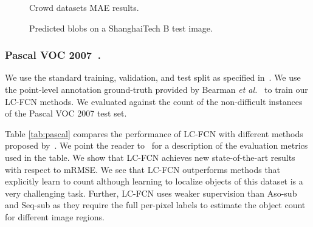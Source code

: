 \documentclass[runningheads]{llncs}
\begin{document}
\begin{figure}[t]
\begin{floatrow}
{\caption{Crowd datasets MAE results.} \label{tab:crowd}}
{\caption{Predicted blobs on a ShanghaiTech B test image.} \label{fig:qual_shanghai}}
\end{floatrow}
\end{figure}\textbf{}

\vspace{-.6cm}
\subsubsection{Pascal VOC 2007~\cite{everingham2015pascal}.}  We use the standard training, validation, and test split as specified in~\cite{everingham2015pascal}. We use the point-level annotation ground-truth provided by Bearman \emph{et al.}~\cite{bearman2016s} to train our LC-FCN methods. We evaluated against the count of the non-difficult instances of the Pascal VOC 2007 test set.





Table \ref{tab:pascal} compares the performance of LC-FCN with different methods proposed by~\cite{chattopadhyay2016counting}. We point the reader to~\cite{chattopadhyay2016counting} for a description of the evaluation metrics used in the table. We show that LC-FCN achieves new state-of-the-art results with respect to mRMSE. We see that LC-FCN outperforms methods that explicitly learn to count although learning to localize objects of this dataset is a very challenging task. Further, LC-FCN uses weaker supervision than Aso-sub and Seq-sub as they require the full per-pixel labels to estimate the object count for different image regions.
\end{document}
